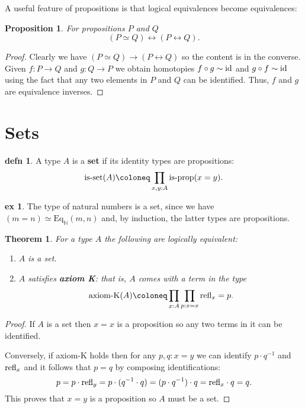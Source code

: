\documentclass{amsart}
\theoremstyle{theorem}
\newtheorem*{thm}{Theorem}
\newtheorem*{prop}{Proposition}
\theoremstyle{definition}
\newtheorem*{defn}{defn}
\newtheorem*{ex}{ex}
\theoremstyle{remark}
\newcommand{\0}{\mathbbe{0}}
\newcommand{\1}{\mathbbe{1}}
\newcommand{\2}{\mathbbe{2}}
\newcommand{\3}{\mathbbe{3}}
\newcommand{\4}{\mathbbe{4}}
\newcommand{\term}[1]{{\textup{#1}}}
\newcommand{\type}[1]{{\textup{#1}}}
\newcommand{\id}{\term{id}}
\newcommand{\bN}{{\mathbb{N}}}
\newcommand{\refl}{\term{refl}}
\newcommand{\Eq}{\mathrm{Eq}}
\newcommand{\is}[1]{\type{is-{#1}}}
\newcommand{\isprop}{\type{is-prop}}
\renewcommand{\iff}{\leftrightarrow}
\begin{document}
A useful feature of propositions is that logical equivalences become equivalences:

\begin{prop} For propositions $P$ and $Q$
\[ (P \simeq Q) \iff (P \iff Q).\]
\end{prop}
\begin{proof}
Clearly we have $(P \simeq Q) \to (P \iff Q)$ so the content is in the converse. Given $f : P \to Q$ and $g : Q \to P$ we obtain homotopies $f \circ g \sim \id$ and $g \circ f \sim \id$ using the fact that any two elements in $P$ and $Q$ can be identified. Thus, $f$ and $g$ are equivalence inverses.
\end{proof}




\section*{Sets}

\begin{defn} A type $A$ is a \textbf{set} if its identity types are propositions:
\[ \is{set}(A) \coloneq \prod_{x,y:A} \isprop(x=y).\]
\end{defn}

\begin{ex} The type of natural numbers is a set, since we have $(m=n) \simeq \Eq_\bN(m,n)$ and, by induction, the latter types are propositions.
\end{ex}

\begin{thm} For a type $A$ the following are logically equivalent:
\begin{enumerate}
\item $A$ is a set.
\item $A$ satisfies \textbf{axiom K}: that is, $A$ comes with a term in the type
\[ \type{axiom-K}(A) \coloneq \prod_{x:A} \prod_{p : x =x} \refl_x = p.\]
\end{enumerate}
\end{thm}
\begin{proof}
If $A$ is a set then $x=x$ is a proposition so any two terms in it can be identified.

Conversely, if axiom-K holds then for any $p,q : x =y$ we can identify $p \cdot q^{-1}$ and $\refl_x$ and it follows that $p=q$ by composing identifications:
\[ p = p \cdot \refl_y = p \cdot (q^{-1} \cdot q) = (p \cdot q^{-1}) \cdot q = \refl_x \cdot q = q.\] This proves that $x=y$ is a proposition so $A$ must be a set.
\end{proof}
\end{document}
